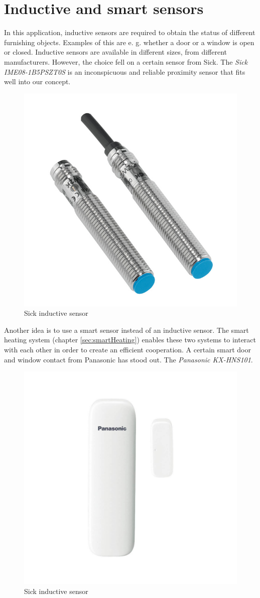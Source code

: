 \section{Inductive and smart sensors}
In this application, inductive sensors are required to obtain the status of different furnishing objects. Examples of this are e. g. whether a door or a window is open or closed. Inductive sensors are available in different sizes, from different manufacturers. However, the choice fell on a certain sensor from Sick. The \textit{Sick IME08-1B5PSZT0S} is an inconspicuous and reliable proximity sensor that fits well into our concept. 
\newpage
\begin{figure}[h]
	\centering
	\includegraphics[width=.4\textwidth]{images/CostAnalysis/sickIni} 
	\caption{Sick inductive sensor}
	\label{fig:sickIni}
\end{figure}

Another idea is to use a smart sensor instead of an inductive sensor. The smart heating system (chapter \ref{sec:smartHeating}) enables these two systems to interact with each other in order to create an efficient cooperation. A certain smart door and window contact from Panasonic has stood out. The \textit{Panasonic KX-HNS101}.

\begin{figure}[h]
	\centering
	\includegraphics[width=.4\textwidth]{images/CostAnalysis/panasonicfensterkontakt} 
	\caption{Sick inductive sensor}
	\label{fig:panasonicSmart}
\end{figure}

